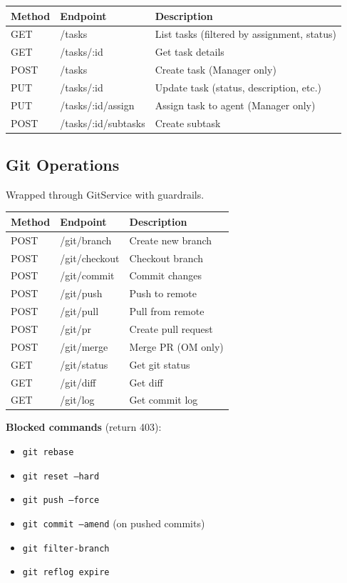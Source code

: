 \documentclass[11pt,a4paper]{article}
\begin{document}
\begin{longtable}{p{2.5cm} p{5cm} p{6cm}}
\toprule
\textbf{Method} & \textbf{Endpoint} & \textbf{Description} \\
\midrule
\endhead
GET    & /tasks                     & List tasks (filtered by assignment, status) \\
GET    & /tasks/:id                 & Get task details \\
POST   & /tasks                     & Create task (Manager only) \\
PUT    & /tasks/:id                 & Update task (status, description, etc.) \\
PUT    & /tasks/:id/assign          & Assign task to agent (Manager only) \\
POST   & /tasks/:id/subtasks        & Create subtask \\
\bottomrule
\end{longtable}

\subsection{Git Operations}

Wrapped through GitService with guardrails.

\begin{longtable}{p{2.5cm} p{5cm} p{6cm}}
\toprule
\textbf{Method} & \textbf{Endpoint} & \textbf{Description} \\
\midrule
\endhead
POST   & /git/branch                & Create new branch \\
POST   & /git/checkout              & Checkout branch \\
POST   & /git/commit                & Commit changes \\
POST   & /git/push                  & Push to remote \\
POST   & /git/pull                  & Pull from remote \\
POST   & /git/pr                    & Create pull request \\
POST   & /git/merge                 & Merge PR (OM only) \\
GET    & /git/status                & Get git status \\
GET    & /git/diff                  & Get diff \\
GET    & /git/log                   & Get commit log \\
\bottomrule
\end{longtable}

\textbf{Blocked commands} (return 403):
\begin{itemize}
  \item \texttt{git rebase}
  \item \texttt{git reset --hard}
  \item \texttt{git push --force}
  \item \texttt{git commit --amend} (on pushed commits)
  \item \texttt{git filter-branch}
  \item \texttt{git reflog expire}
\end{itemize}
\end{document}

